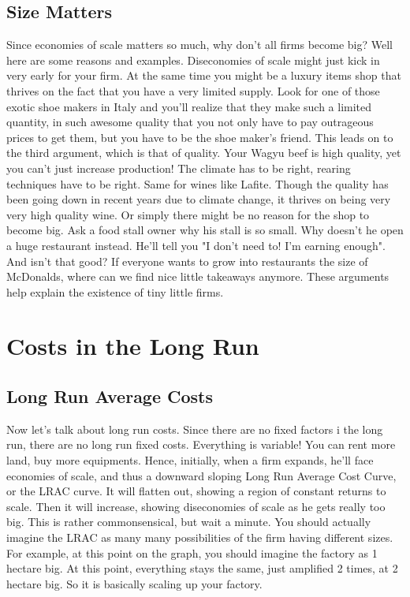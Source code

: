 \subsection{Size Matters}
Since economies of scale matters so much, why don't all firms become big? Well here are some reasons and examples. Diseconomies of scale might just kick in very early for your firm. At the same time you might be a luxury items shop that thrives on the fact that you have a very limited supply. Look for one of those exotic shoe makers in Italy and you'll realize that they make such a limited quantity, in such awesome quality that you not only have to pay outrageous prices to get them, but you have to be the shoe maker's friend. This leads on to the third argument, which is that of quality. Your Wagyu beef is high quality, yet you can't just increase production! The climate has to be right, rearing techniques have to be right. Same for wines like Lafite. Though the quality has been going down in recent years due to climate change, it thrives on being very very high quality wine. Or simply there might be no reason for the shop to become big. Ask a food stall owner why his stall is so small. Why doesn't he open a huge restaurant instead. He'll tell you "I don't need to! I'm earning enough". And isn't that good? If everyone wants to grow into restaurants the size of McDonalds, where can we find nice little takeaways anymore. These arguments help explain the existence of tiny little firms. 
\section{Costs in the Long Run}
\subsection{Long Run Average Costs}
Now let's talk about long run costs. Since there are no fixed factors i the long run, there are no long run fixed costs. Everything is variable! You can rent more land, buy more equipments. Hence, initially, when a firm expands, he'll face economies of scale, and thus a downward sloping Long Run Average Cost Curve, or the LRAC curve. It will flatten out, showing a region of constant returns to scale. Then it will increase, showing diseconomies of scale as he gets really too big. This is rather commonsensical, but wait a minute. You should actually imagine the LRAC as many many possibilities of the firm having different sizes. For example, at this point on the graph, you should imagine the factory as 1 hectare big. At this point, everything stays the same, just amplified 2 times, at 2 hectare big. So it is basically scaling up your factory. 
